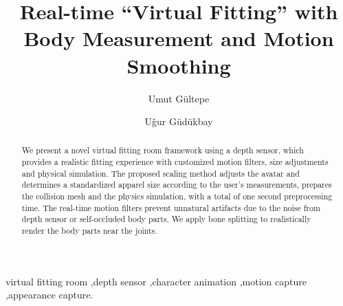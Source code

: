 \documentclass[number,preprint,review,12pt]{elsarticle}
\begin{document}
\begin{frontmatter}



\title{Real-time ``Virtual Fitting'' with \\Body Measurement and Motion Smoothing}


\author{Umut G\"{u}ltepe}
\author{U\v{g}ur G\"{u}d\"{u}kbay}

\address{Bilkent University, Department of Computer Engineering, Bilkent 06800 Ankara Turkey}

\begin{abstract}
We present a novel virtual fitting room framework using a depth sensor, which provides a realistic fitting experience with customized motion filters, size adjustments and physical simulation. The proposed scaling method adjusts the avatar and {\color{red} determines a standardized apparel size according to the user's measurements}, prepares the collision mesh and the physics simulation, with a total of one second preprocessing time. The real-time motion filters prevent unnatural artifacts due to the noise from depth sensor or self-occluded body parts. We apply bone splitting to realistically render the body parts near the joints.
\end{abstract}

\begin{keyword}
virtual fitting room \sep depth sensor \sep character animation \sep motion capture \sep appearance capture.

\end{keyword}

\end{frontmatter}
\end{document}

